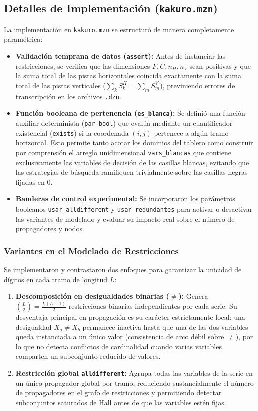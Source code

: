 \subsection{Detalles de Implementación (\texttt{kakuro.mzn})}
La implementación en \texttt{kakuro.mzn} se estructuró de manera completamente paramétrica:
\begin{itemize}
    \item \textbf{Validación temprana de datos (\texttt{assert}):} Antes de instanciar las restricciones, se verifica que las dimensiones $F, C, n_H, n_V$ sean positivas y que la suma total de las pistas horizontales coincida exactamente con la suma total de las pistas verticales ($\sum_k S^H_k = \sum_m S^V_m$), previniendo errores de transcripción en los archivos \texttt{.dzn}.
    \item \textbf{Función booleana de pertenencia (\texttt{es\_blanca}):} Se definió una función auxiliar determinista (\texttt{par bool}) que evalúa mediante un cuantificador existencial (\texttt{exists}) si la coordenada $(i, j)$ pertenece a algún tramo horizontal. Esto permite tanto acotar los dominios del tablero como construir por comprensión el arreglo unidimensional \texttt{vars\_blancas} que contiene exclusivamente las variables de decisión de las casillas blancas, evitando que las estrategias de búsqueda ramifiquen trivialmente sobre las casillas negras fijadas en $0$.
    \item \textbf{Banderas de control experimental:} Se incorporaron los parámetros booleanos \texttt{usar\_alldifferent} y \texttt{usar\_redundantes} para activar o desactivar las variantes de modelado y evaluar su impacto real sobre el número de propagadores y nodos.
\end{itemize}

\subsubsection{Variantes en el Modelado de Restricciones}
Se implementaron y contrastaron dos enfoques para garantizar la unicidad de dígitos en cada tramo de longitud $L$:
\begin{enumerate}
    \item \textbf{Descomposición en desigualdades binarias ($\neq$):} Genera $\binom{L}{2} = \frac{L(L-1)}{2}$ restricciones binarias independientes por cada serie. Su desventaja principal en propagación es su carácter estrictamente local: una desigualdad $X_a \neq X_b$ permanece inactiva hasta que una de las dos variables queda instanciada a un único valor (consistencia de arco débil sobre $\neq$), por lo que no detecta conflictos de cardinalidad cuando varias variables comparten un subconjunto reducido de valores.
    \item \textbf{Restricción global \texttt{alldifferent}:} Agrupa todas las variables de la serie en un único propagador global por tramo, reduciendo sustancialmente el número de propagadores en el grafo de restricciones y permitiendo detectar subconjuntos saturados de Hall antes de que las variables estén fijas.
\end{enumerate}

